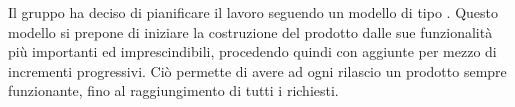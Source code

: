 Il gruppo \Gruppo{} ha deciso di pianificare il lavoro seguendo un modello di tipo \textbf {}. Questo modello si prepone di iniziare la costruzione del prodotto dalle sue funzionalità più importanti ed imprescindibili, procedendo quindi con aggiunte per mezzo di incrementi progressivi. Ciò permette di avere ad ogni rilascio un prodotto sempre funzionante, fino al raggiungimento di tutti i  richiesti.